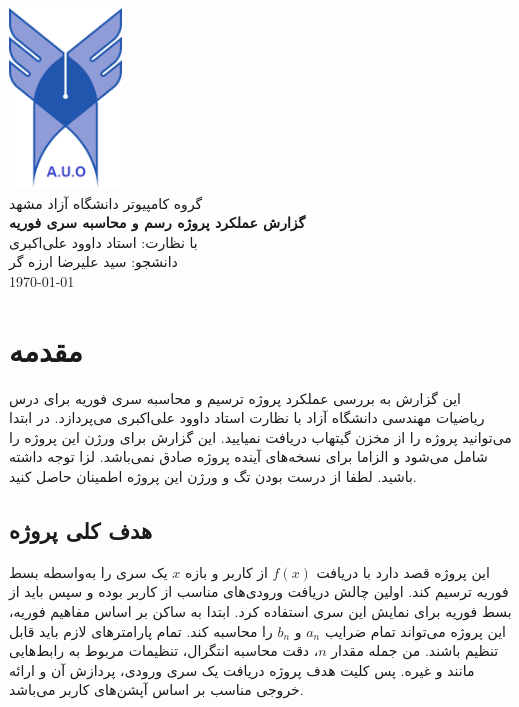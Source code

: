 \documentclass[a4paper]{report}
\begin{document}
\begin{titlepage}
\centering
{\includegraphics[width=3cm]{assets/logo.png}}\\[0.5cm]
گروه کامپیوتر دانشگاه آزاد مشهد\\[1cm]
{\LARGE \textbf{گزارش عملکرد پروژه رسم و محاسبه سری فوریه}}\\[1cm]
با نظارت: استاد داوود علی‌اکبری\\[0.5cm]
دانشجو: سید علیرضا ارزه گر\\[0.5cm]
\today\\[1cm]
\end{titlepage}

\cleardoublepage

\tableofcontents
\newpage

\section{مقدمه}

این گزارش به بررسی عملکرد پروژه ترسیم و محاسبه سری فوریه برای درس ریاضیات مهندسی دانشگاه آزاد
با نظارت استاد داوود علی‌اکبری می‌پردازد. در ابتدا می‌توانید پروژه را از مخزن گیتهاب دریافت نمیایید.
این گزارش برای ورژن  این پروژه را شامل می‌شود و الزاما برای نسخه‌های آینده پروژه صادق نمی‌باشد.
لزا توجه داشته باشید. لطفا از درست بودن تگ و ورژن این پروژه اطمینان حاصل کنید.

\subsection{هدف کلی پروژه}

این پروژه قصد دارد با دریافت $f(x)$ از کاربر و بازه $x$ یک سری را به‌واسطه بسط فوریه ترسیم کند.
اولین چالش دریافت ورودی‌های مناسب از کاربر بوده و سپس باید از بسط فوریه برای نمایش این سری استفاده کرد.
ابتدا به ساکن بر اساس مفاهیم فوریه، این پروژه می‌تواند تمام ضرایب $a_n$ و $b_n$ را محاسبه کند. تمام پارامترهای
لازم باید قابل تنظیم باشند. من جمله مقدار $n$، دقت محاسبه انتگرال، تنظیمات مربوط به رابط‌هایی مانند
و غیره. پس کلیت هدف پروژه دریافت یک سری ورودی، پردازش آن و ارائه خروجی مناسب بر اساس آپشن‌های کاربر می‌باشد.
\end{document}
